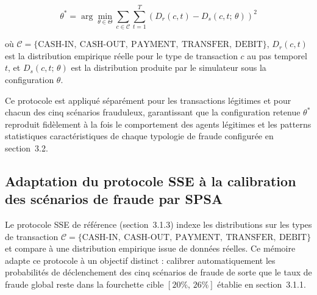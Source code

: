 \documentclass[11pt,a4paper,oneside]{report}
\theoremstyle{definition}
\theoremstyle{remark}
\begin{document}
\begin{equation}
    \theta^* = \arg\min_{\theta \in \Theta} \sum_{c \in \mathcal{C}} \sum_{t=1}^{T} \left(D_r(c, t) - D_s(c, t;\, \theta)\right)^2
\end{equation}

où $\mathcal{C} = \{\text{CASH-IN},\ \text{CASH-OUT},\ \text{PAYMENT},\ \text{TRANSFER},\ \text{DEBIT}\}$, $D_r(c, t)$ est la distribution empirique réelle pour le type de transaction $c$ au pas temporel $t$, et $D_s(c, t;\, \theta)$ est la distribution produite par le simulateur sous la configuration $\theta$.

Ce protocole est appliqué séparément pour les transactions légitimes et pour chacun des cinq scénarios frauduleux, garantissant que la configuration retenue $\theta^*$ reproduit fidèlement à la fois le comportement des agents légitimes et les patterns statistiques caractéristiques de chaque typologie de fraude configurée en section~3.2.

\subsection{Adaptation du protocole SSE à la calibration des scénarios de fraude par SPSA}

Le protocole SSE de référence (section~3.1.3) indexe les distributions sur les types de transaction $\mathcal{C} = \{\text{CASH-IN},\ \text{CASH-OUT},\ \text{PAYMENT},\ \text{TRANSFER},\ \text{DEBIT}\}$ et compare à une distribution empirique issue de données réelles. Ce mémoire adapte ce protocole à un objectif distinct : calibrer automatiquement les probabilités de déclenchement des cinq scénarios de fraude de sorte que le taux de fraude global reste dans la fourchette cible $[20\%,\, 26\%]$ établie en section~3.1.1.
\end{document}

